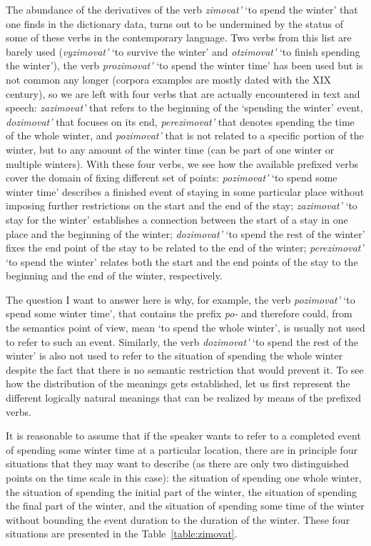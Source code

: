 The abundance of the derivatives of the verb \textit{zimovat'} `to spend the winter' that one finds in the dictionary data, turns out to be undermined by the status of some of these verbs in the contemporary language. Two verbs from this list are barely used (\textit{vyzimovat'} `to survive the winter' and \textit{otzimovat'} `to finish spending the winter'), the verb \textit{prozimovat'} `to spend the winter time' has been used but is not common any longer (corpora examples are mostly dated with the XIX century), so we are left with four verbs that are actually encountered in text and speech: \textit{zazimovat'} that refers to the beginning of the `spending the winter' event, \textit{dozimovat'} that focuses on its end, \textit{perezimovat'} that denotes spending the time of the whole winter, and \textit{pozimovat'} that is not related to a specific portion of the winter, but to any amount of the winter time (can be part of one winter or multiple winters). With these four verbs, we see how the available prefixed verbs cover the domain of fixing different set of points: \textit{pozimovat'} `to spend some winter time' describes a finished event of staying in some particular place without imposing further restrictions on the start and the end of the stay; \textit{zazimovat'} `to stay for the winter' establishes a connection between the start of a stay in one place and the beginning of the winter; \textit{dozimovat'} `to spend the rest of the winter' fixes the end point of the stay to be related to the end of the winter; \textit{perezimovat'} `to spend the winter' relates both the start and the end points of the stay to the beginning and the end of the winter, respectively.

The question I want to answer here is why, for example, the verb \textit{pozimovat'} `to spend some winter time', that contains the prefix \textit{po-} and therefore could, from the semantics point of view, mean `to spend the whole winter', is usually not used to refer to such an event. Similarly, the verb \textit{dozimovat'} `to spend the rest of the winter' is also not used to refer to the situation of spending the whole winter despite the fact that there is no semantic restriction that would prevent it. To see how the distribution of the meanings gets established, let us first represent the different logically natural meanings that can be realized by means of the prefixed verbs. 

It is reasonable to assume that if the speaker wants to refer to a completed event of spending some winter time at a particular location, there are in principle four situations that they may want to describe (as there are only two distinguished points on the time scale in this case): the situation of spending one whole winter, the situation of spending the initial part of the winter, the situation of spending the final part of the winter, and the situation of spending some time of the winter without bounding the event duration to the duration of the winter. These four situations are presented in the Table~\ref{table:zimovat}.

